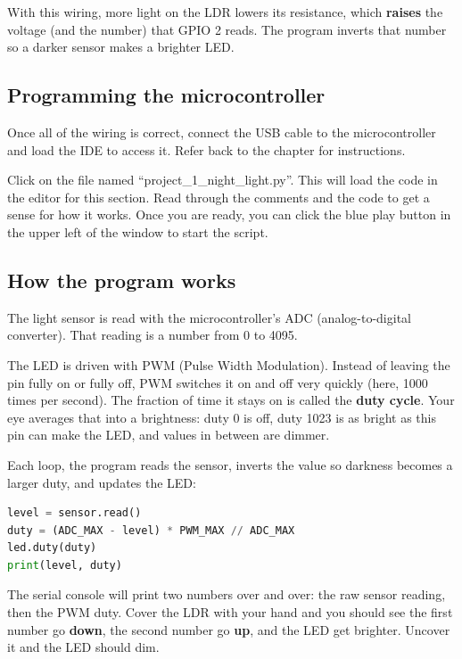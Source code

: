 With this wiring, more light on the LDR lowers its resistance, which \textbf{raises} the voltage (and the
number) that GPIO 2 reads. The program inverts that number so a darker sensor makes a brighter LED.

\subsection{Programming the microcontroller}

Once all of the wiring is correct, connect the USB cable to the microcontroller and load the IDE to
access it. Refer back to the  chapter for instructions.

Click on the file named ``project\_1\_night\_light.py''. This will load the code in the editor for this section.
Read through the comments and the code to get a sense for how it works. Once you are ready, you can
click the blue play button in the upper left of the window to start the script.

\subsection{How the program works}

The light sensor is read with the microcontroller's ADC (analog-to-digital converter). That reading is
a number from 0 to 4095.

The LED is driven with PWM (Pulse Width Modulation). Instead of leaving the pin fully on or fully off,
PWM switches it on and off very quickly (here, 1000 times per second). The fraction of time it stays on
is called the \textbf{duty cycle}. Your eye averages that into a brightness: duty 0 is off, duty 1023 is
as bright as this pin can make the LED, and values in between are dimmer.

Each loop, the program reads the sensor, inverts the value so darkness becomes a larger duty, and updates
the LED:

\begin{lstlisting}[language=Python, caption=Mapping sensor reading to LED brightness]
level = sensor.read()
duty = (ADC_MAX - level) * PWM_MAX // ADC_MAX
led.duty(duty)
print(level, duty)
\end{lstlisting}

The serial console will print two numbers over and over: the raw sensor reading, then the PWM duty.
Cover the LDR with your hand and you should see the first number go \textbf{down}, the second number go
\textbf{up}, and the LED get brighter. Uncover it and the LED should dim.

